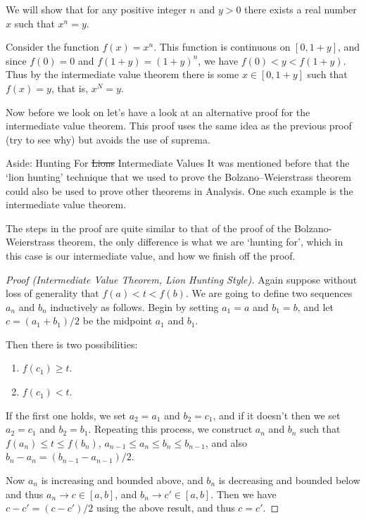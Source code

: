 \begin{example}
	We will show that for any positive integer $n$ and $y > 0$ there exists a real number $x$ such that $x^n = y$.

	Consider the function $f(x) = x^n$. This function is continuous on $[0, 1 + y]$, and since $f(0) = 0$ and $f(1 + y) = (1 + y)^n$, we have $f(0) < y < f(1 + y)$.
	Thus by the intermediate value theorem there is some $x \in [0, 1+ y]$ such that $f(x) = y$, that is, $x^N = y$.
\end{example}

Now before we look on let's have a look at an alternative proof for the intermediate value theorem. This proof uses the same idea as the previous proof (try to see why) but avoids the use of suprema.

\begin{aside}{Aside: Hunting For \st{Lions} Intermediate Values}
	It was mentioned before that the `lion hunting' technique that we used to prove the Bolzano–Weierstrass theorem could also be used to prove other theorems in Analysis. One such example is the intermediate value theorem.

	The steps in the proof are quite similar to that of the proof of the Bolzano-Weierstrass theorem, the only difference is what we are `hunting for', which in this case is our intermediate value, and how we finish off the proof.

	\begin{proof}[Proof (Intermediate Value Theorem, Lion Hunting Style)]
Again suppose without loss of generality that $f(a) < t < f(b)$.
We are going to define two sequences $a_n$ and $b_n$ inductively as follows. Begin by setting $a_1 = a$ and $b_1=b$, and let $c = (a_1 + b_1)/2$ be the midpoint $a_1$ and $b_1$.

Then there is two possibilities:
\begin{enumerate}
\item $f(c_1) \geq t$.
\item $f(c_1) < t$.
\end{enumerate}
If the first one holds, we set $a_2 = a_1$ and $b_2 = c_1$, and if it doesn't then we set $a_2 = c_1$ and $b_2 = b_1$.
Repeating this process, we construct $a_n$ and $b_n$ such that $f(a_n) \leq t \leq f(b_n)$, $a_{n - 1} \leq a_n \leq b_n \leq b_{n - 1}$, and also $b_n - a_n = (b_{n - 1} - a_{n - 1})/2$.

Now $a_n$ is increasing and bounded above, and $b_n$ is decreasing and bounded below and thus $a_n \rightarrow c \in [a, b]$, and $b_n \rightarrow c' \in [a, b]$. Then we have $c - c' = (c - c')/2$ using the above result, and thus $c = c'$.


\end{proof}
\end{aside}
